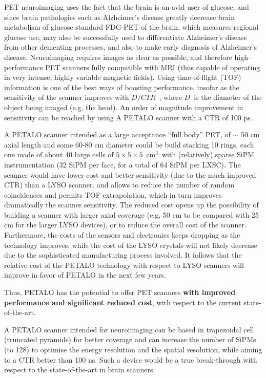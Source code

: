 \documentclass[11pt,a4paper]{article}
\begin{document}
PET neuroimaging uses the fact that the brain is an avid user of glucose, and since brain pathologies such as Alzheimer's disease greatly decrease brain metabolism of glucose standard FDG-PET of the brain, which measures regional glucose use, may also be successfully used to differentiate Alzheimer's disease from other dementing processes, and also to make early diagnosis of Alzheimer's disease. Neuroimaging requires images as clear as possible, and therefore high--performance PET scanners fully compatible with MRI (thus capable of operating in very intense, highly variable magnetic fields). Using time-of-flight (TOF) information is one of the best ways of boosting performance, insofar as the sensitivity of the scanner improves with $D/CTR$~, where $D$~is the diameter of the object being imaged (e.g, the head). An order of magnitude improvement in sensitivity can be reached by using
A PETALO scanner with a CTR of 100 ps. 

A PETALO scanner intended as a large acceptance ``full body'' PET, of $\sim$ 50 cm axial length and some 60-80 cm diameter could be build stacking 10 rings, each one made of about 40 large cells of $5 \times 5 \times 5$~cm$^3$~with (relatively) sparse SiPM instrumentation (32 SiPM per face, for a total of 64 SiPM per LXSC). The scanner would have lower cost and better sensitivity (due to the much improved CTR) than a LYSO scanner.  and  allows to reduce the number of random coincidences and permits TOF extrapolation, which in turn improves dramatically the scanner sensitivity. The reduced cost opens up the possibility of building a scanner with larger axial coverage (e.g, 50 cm to be compared with 25 cm for the larger LYSO devices), or to reduce the overall cost of the scanner. Furthermore, the costs of the sensors and electronics keeps dropping as the technology improves, while the cost of the LYSO crystals will not likely decrease due to the sophisticated manufacturing process involved. It follows that the relative cost of the PETALO technology with respect to LYSO scanners will improve in favor of PETALO in the next few years. 

\begin{framed}
Thus, PETALO has the potential to offer PET scanners {\bf with improved performance and significant reduced cost}, with respect to the current state-of-the-art.
\end{framed}

A PETALO scanner intended for neuroimaging can be based in trapezoidal cell (truncated pyramids) for better coverage and can increase the number of SiPMs (to 128) to optimise the energy resolution and the spatial resolution, while aiming to a  CTR  better than 100 ns. Such a device would be a true break-through with respect to the state-of-the-art in brain scanners. 
\end{document}
